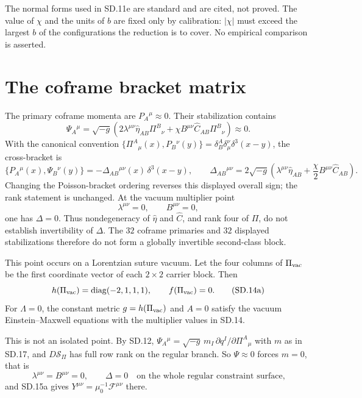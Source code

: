 \documentclass[10pt]{article}
\newcommand{\hateta}{\widehat\eta}
\newcommand{\hatC}{\widehat C}
\begin{document}
\begin{remark}
The normal forms used in SD.11e are standard and are cited, not proved. The
value of $\chi$ and the units of $b$ are fixed only by calibration: $|\chi|$
must exceed the largest $b$ of the configurations the reduction is to cover.
No empirical comparison is asserted.
\end{remark}

\section{The coframe bracket matrix}

The primary coframe momenta are $P_A{}^\mu\approx0$. Their stabilization
contains
\[
\Psi_A{}^\mu=\sqrt{-g}\left(
2\lambda^{\mu\nu}\hateta_{AB}\Pi^B{}_{\nu}
+\chi B^{\mu\nu}\hatC_{AB}\Pi^B{}_{\nu}\right)\approx0.
\tag{SD.12}
\]
With the canonical convention
$\{\Pi^A{}_{\mu}(x),P_B{}^\nu(y)\}=\delta^A_B\delta_\mu^\nu
\delta^3(x-y)$, the cross-bracket is
\[
\{P_A{}^\mu(x),\Psi_B{}^\nu(y)\}
=-\Delta_{AB}{}^{\mu\nu}(x)\,\delta^3(x-y),
\qquad
\Delta_{AB}{}^{\mu\nu}
=2\sqrt{-g}\left(
\lambda^{\mu\nu}\hateta_{AB}
+\frac\chi2B^{\mu\nu}\hatC_{AB}\right).
\tag{SD.13}
\]
Changing the Poisson-bracket ordering reverses this displayed overall sign;
the rank statement is unchanged.
At the vacuum multiplier point
\[
\lambda^{\mu\nu}=0,\qquad B^{\mu\nu}=0,
\tag{SD.14}
\]
one has $\Delta=0$. Thus nondegeneracy of $\hateta$ and $\hatC$, and rank
four of $\Pi$, do not establish invertibility of $\Delta$. The $32$ coframe
primaries and $32$ displayed stabilizations therefore do not form a globally
invertible second-class block.

This point occurs on a Lorentzian suture vacuum. Let the four columns of
$\Pi_{\rm vac}$ be the first coordinate vector of each $2\times2$ carrier
block. Then
\[
h(\Pi_{\rm vac})=\operatorname{diag}(-2,1,1,1),
\qquad
f(\Pi_{\rm vac})=0.
\tag{SD.14a}
\]
For $\Lambda=0$, the constant metric $g=h(\Pi_{\rm vac})$ and $A=0$ satisfy
the vacuum Einstein--Maxwell equations with the multiplier values in SD.14.

This is not an isolated point. By SD.12,
$\Psi_A{}^\mu=\sqrt{-g}\,m_I\,\partial q^I/\partial\Pi^A{}_\mu$ with $m$ as in
SD.17, and $D\mathscr S_\Pi$ has full row rank on the regular branch. So
$\Psi\approx0$ forces $m=0$, that is
\[
\lambda^{\mu\nu}=B^{\mu\nu}=0,\qquad \Delta=0
\quad\text{on the whole regular constraint surface,}
\tag{SD.14b}
\]
and SD.15a gives $Y^{\mu\nu}=\mu_0^{-1}\mathcal F^{\mu\nu}$ there.
\end{document}
